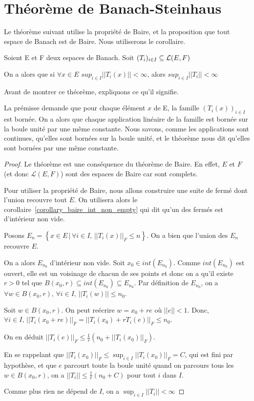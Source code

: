 \chapter{Théorème de Banach-Steinhaus}

Le théorème suivant utilise la propriété de Baire, et la proposition que tout
espace de Banach est de Baire. Nous utiliserons le corollaire.

\begin{theorem} 
	Soient E et F deux espaces de Banach.
	Soit $(T_{i})_{i \in I} \subseteq \mathcal{L}(E, F)$
	\label{banach-steinhaus}

	On a alors que si $\forall x \in E$ $sup_{i \in I}||T_{i}(x)|| < \infty$,
	alors $sup_{i \in I} ||T_{i}|| < \infty$
\end{theorem}

Avant de montrer ce théorème, expliquons ce qu'il signifie.

La prémisse demande que pour chaque élément $x$ de E, la famille $(T_{i}(x))_{i
\in I}$ est bornée.
On a alors que chaque application linéaire de la famille est bornée sur la
boule unité par une même constante. Nous savons, comme les applications sont
continues, qu'elles sont bornées sur la boule unité, et le théorème nous dit
qu'elles sont bornées par une même constante.

\begin{proof}
	Le théorème est une conséquence du théorème de Baire. En effet, $E$ et $F$
	(et donc $\mathcal{L}(E, F)$) sont des espaces de Baire car sont complets.

	Pour utiliser la propriété de Baire, nous allons construire une suite de
	fermé dont l'union recouvre tout $E$. On utilisera alors le
	corollaire~\ref{corollary_baire_int_non_empty} qui dit qu'un des fermés est
	d'intérieur non vide.

	Posons $E_{n} = \left\{ x \in E \, | \, \forall i \in I, \, ||T_{i}(x)||_{F}
\leq n \right\}$. On a bien que l'union des $E_{n}$ recouvre $E$.

On a alors $E_{n_{0}}$ d'intérieur non vide. Soit $x_{0} \in int({E_{n_{0}}})$.
Comme $int({E_{n_{0}}})$ est ouvert, elle est un voisinage de chacun de ses
points et donc on a qu'il existe $r > 0$ tel que $B(x_{0}, r)
\subseteq int({E_{n_{0}}}) \subseteq E_{n_{0}}$. Par définition de $E_{n_{0}}$,
on a $\forall w \in B(x_{0}, r), \, \forall i \in I, \, ||T_{i}(w)|| \leq n_{0}$.

	Soit $w \in B(x_{0}, r)$. On peut reécrire $w = x_{0} + r e$ où $||e|| <
	1$. Donc, $\forall i \in I, \, ||T_{i}(x_{0} + re)||_{F} = ||T_{i}(x_{0}) +
	rT_{i}(e)||_{F} \leq n_{0}$. 

	On en déduit $||T_{i}(e)||_{F} \leq \displaystyle \frac{1}{r} (n_{0} +
	||T_{i}(x_{0})||_{F})$.

	En se rappelant que $||T_{i}(x_{0})||_{F} \leq \sup_{i \in I}
	||T_{i}(x_{0})||_{F} = C$, qui est fini par hypothèse, et que $e$ parcourt toute
	la boule unité quand on parcours tous les $w \in B(x_{0}, r)$, on a
	$||T_{i}|| \leq \displaystyle \frac{1}{r} (n_{0} + C)$ pour tout $i$ dans
	$I$.

	Comme plus rien ne dépend de $I$, on a $\sup_{i \in I}||T_{i}|| < \infty$ 
\end{proof}


